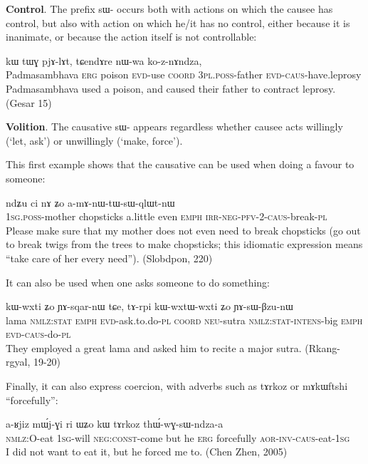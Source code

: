 \documentclass[oldfontcommands,oneside,a4paper,11pt]{memoir}
\newcommand{\ipa}[1]{{\phon #1}} %
\newcommand{\aor}{\textsc{aor}}
\newcommand{\caus}{\textsc{caus}}
\newcommand{\coord}{\textsc{coord}}
\newcommand{\const}{\textsc{const}}
\newcommand{\erg}{\textsc{erg}}
\newcommand{\emphat}{\textsc{emph}}
\newcommand{\evd}{\textsc{evd}}
\newcommand{\intens}{\textsc{intens}}
\newcommand{\inv}{\textsc{inv}}
\newcommand{\irr}{\textsc{irr}}
\newcommand{\negat}{\textsc{neg}}
\newcommand{\neu}{\textsc{neu}}
\newcommand{\nmlz}{\textsc{nmlz}}
\newcommand{\pfv}{\textsc{pfv}}
\newcommand{\pl}{\textsc{pl}}
\newcommand{\poss}{\textsc{poss}}
\newcommand{\sg}{\textsc{sg}}
\newcommand{\stat}{\textsc{stat}}
\begin{document}
   \textbf{Control}. The prefix \ipa{sɯ-} occurs both with actions on which the causee has control, but also with action on which he/it has no control, either because it is inanimate, or because the action itself is not controllable:
 \begin{exe}
\ex 
\gll  \ipa{ɯrɟɤnpanma} 	\ipa{kɯ} 	\ipa{tɯɣ} 	\ipa{pjɤ-lɤt,} 	\ipa{tɕendɤre} 	\ipa{nɯ-wa} 	\ipa{ko-z-nɤndza,}  \\
Padmasambhava \erg{} poison \evd{}-use \coord{} 3\pl{}.\poss{}-father \evd{}-\caus{}-have.leprosy \\
 \glt Padmasambhava used a poison, and caused their father to contract leprosy.    (Gesar 15)
\end{exe}

 \textbf{Volition}. The causative \ipa{sɯ-} appears regardless whether causee acts willingly (`let, ask') or unwillingly (`make, force').
 
 This first example shows that the causative can be used when doing a favour to someone:
  \begin{exe}
\ex 
\gll   \ipa{a-mu} 	\ipa{ndʑu} 	\ipa{ci} \ipa{nɤ}	\ipa{ʑo} 	\ipa{a-mɤ-nɯ-tɯ-sɯ-qlɯt-nɯ} \\
  1\sg{}.\poss{}-mother chopsticks a.little even \emphat{} \irr{}-\negat{}-\pfv{}-2-\caus{}-break-\pl{} \\
 \glt    Please make sure that my mother does not even need to break chopsticks (go out to break twigs from the trees to make chopsticks; this idiomatic expression means ``take care of her every need''). (Slobdpon, 220)
\end{exe}

 It can also be used when one asks someone to do something:
 \begin{exe}
\ex 
\gll  \ipa{βlama} 	\ipa{kɯ-wxti} 	\ipa{ʑo} 	\ipa{ɲɤ-sqar-nɯ} 	\ipa{tɕe,} 	\ipa{tɤ-rpi} 	\ipa{kɯ-wxtɯ-wxti} 	\ipa{ʑo} 	\ipa{ɲɤ-sɯ-βzu-nɯ}  \\
lama \nmlz{}:\stat{} \emphat{} \evd{}-ask.to.do-\pl{} \coord{} \neu{}-sutra \nmlz{}:\stat{}-\intens{}-big \emphat{} \evd{}-\caus{}-do-\pl{} \\
 \glt   They employed a great lama and asked him to recite a major sutra. (Rkang-rgyal, 19-20)
\end{exe}

Finally, it can also express coercion, with adverbs such as \ipa{tɤrkoz} 	or \ipa{mɤkɯftshi} ``forcefully'':
 \begin{exe}
\ex 
\gll \ipa{kɤ-ndza} 	\ipa{a-ʁjiz} 	\ipa{mɯ́j-ɣi} 	\ipa{ri} 	\ipa{ɯʑo} 	\ipa{kɯ} 	\ipa{tɤrkoz} 	\ipa{thɯ́-wɣ-sɯ-ndza-a} \\
\nmlz{}:O-eat 1\sg{}-will \negat{}:\const{}-come but he \erg{} forcefully \aor{}-\inv{}-\caus{}-eat-1\sg{} \\
 \glt   I did not want to eat it, but he forced me to. (Chen Zhen, 2005)
\end{exe}
\end{document}
